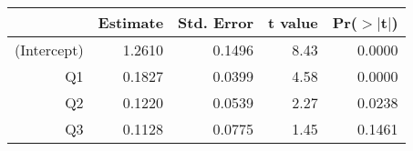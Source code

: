 \begin{table}[ht]
\centering
\begin{tabular}{rrrrr}
  \hline
 & Estimate & Std. Error & t value & Pr($>$$|$t$|$) \\ 
  \hline
(Intercept) & 1.2610 & 0.1496 & 8.43 & 0.0000 \\ 
  Q1 & 0.1827 & 0.0399 & 4.58 & 0.0000 \\ 
  Q2 & 0.1220 & 0.0539 & 2.27 & 0.0238 \\ 
  Q3 & 0.1128 & 0.0775 & 1.45 & 0.1461 \\ 
   \hline
\end{tabular}
\end{table}

